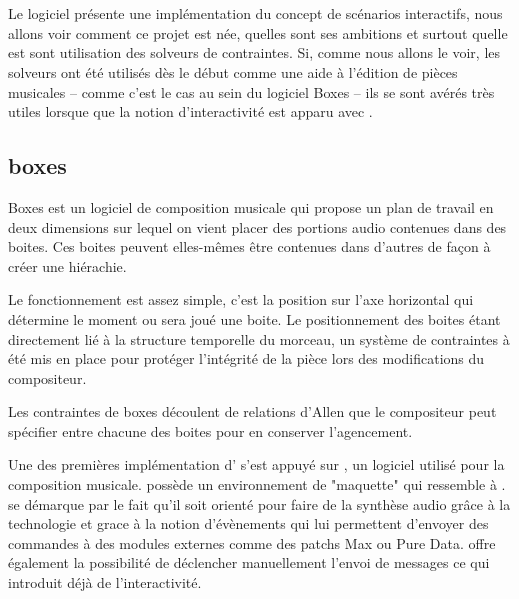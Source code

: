 \section{\iscore{}}

Le logiciel \iscore{} présente une implémentation du concept de scénarios interactifs, nous allons voir comment ce projet est née, quelles sont ses ambitions et surtout quelle est sont utilisation des solveurs de contraintes. Si, comme nous allons le voir, les solveurs ont été utilisés dès le début comme une aide à l'édition de pièces musicales -- comme c'est le cas au sein du logiciel Boxes -- ils se sont avérés très utiles lorsque que la notion d'interactivité est apparu avec \iscore{}.

\subsection{boxes}%

Boxes\cite{Beurive2000boxes} est un logiciel de composition musicale qui propose un plan de travail en deux dimensions  sur lequel on vient placer des portions audio contenues dans des boites. Ces boites peuvent elles-mêmes être contenues dans d'autres de façon à créer une hiérachie.


Le fonctionnement est assez simple, c'est la position sur l'axe horizontal qui détermine le moment ou sera joué une boite. Le positionnement des boites étant directement lié à la structure temporelle du morceau, un système de contraintes à été mis en place pour protéger l'intégrité de la pièce lors des modifications du compositeur.

Les contraintes de boxes découlent de relations d'Allen  que le compositeur peut spécifier entre chacune des boites pour en conserver l'agencement.


Une des premières implémentation d'\iscore{} s'est appuyé sur \openmusic{}, un logiciel utilisé pour la composition musicale. \openmusic{} possède un environnement de "maquette" qui ressemble à \boxes{}. \openmusic{} se démarque par le fait qu'il soit orienté pour faire de la synthèse audio grâce à la technologie \osc{} et grace à la notion d'évènements qui lui permettent d'envoyer des commandes à des modules externes comme des patchs Max ou Pure Data. \openmusic{} offre également la possibilité de déclencher manuellement l'envoi de messages \osc{} ce qui introduit déjà de l'interactivité.

